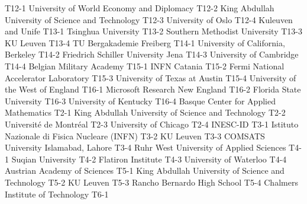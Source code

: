 \begin{multicols}{2}
{T12-1}
{}
{University of World Economy and Diplomacy}
{T12-2}
{}
{King Abdullah University of Science and Technology}
{T12-3}
{}
{University of Oslo}
{T12-4}
{}
{Kuleuven and Unife}
{T13-1}
{}
{Tsinghua University}
{T13-2}
{}
{Southern Methodist University}
{T13-3}
{}
{KU Leuven}
{T13-4}
{}
{TU Bergakademie Freiberg}
{T14-1}
{}
{University of California, Berkeley}
{T14-2}
{}
{Friedrich Schiller University Jena}
{T14-3}
{}
{University of Cambridge}
{T14-4}
{}
{Belgian Military Academy}
{T15-1}
{}
{INFN Catania}
{T15-2}
{}
{Fermi National Accelerator Laboratory}
{T15-3}
{}
{University of Texas at Austin}
{T15-4}
{}
{University of the West of England}
{T16-1}
{}
{Microsoft Research New England}
{T16-2}
{}
{Florida State University}
{T16-3}
{}
{University of Kentucky}
{T16-4}
{}
{Basque Center for Applied Mathematics}
{T2-1}
{}
{King Abdullah University of Science and Technology}
{T2-2}
{}
{Université de Montréal}
{T2-3}
{}
{University of Chicago}
{T2-4}
{}
{INESC-ID}
{T3-1}
{}
{Istituto Nazionale di Fisica Nucleare (INFN)}
{T3-2}
{}
{KU Leuven}
{T3-3}
{}
{COMSATS University Islamabad, Lahore}
{T3-4}
{}
{Ruhr West University of Applied Sciences}
{T4-1}
{}
{Suqian University}
{T4-2}
{}
{Flatiron Institute}
{T4-3}
{}
{University of Waterloo}
{T4-4}
{}
{Austrian Academy of Sciences}
{T5-1}
{}
{King Abdullah University of Science and Technology}
{T5-2}
{}
{KU Leuven}
{T5-3}
{}
{Rancho Bernardo High School}
{T5-4}
{}
{Chalmers Institute of Technology}
{T6-1}
{}

\end{multicols}
